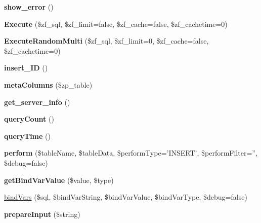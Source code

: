 \begin{DoxyCompactItemize}
\item 
\hypertarget{classquery_factory_ab9ab82f19f9eaf7617f6f3c1ba6398bb}{
{\bfseries show\_\-error} ()}
\label{classquery_factory_ab9ab82f19f9eaf7617f6f3c1ba6398bb}

\item 
\hypertarget{classquery_factory_a5c71f0bd2a0ae26b0c5ac604b0c73b60}{
{\bfseries Execute} (\$zf\_\-sql, \$zf\_\-limit=false, \$zf\_\-cache=false, \$zf\_\-cachetime=0)}
\label{classquery_factory_a5c71f0bd2a0ae26b0c5ac604b0c73b60}

\item 
\hypertarget{classquery_factory_a576bbb7ea2a6ec17eb38b6f680b8d6b2}{
{\bfseries ExecuteRandomMulti} (\$zf\_\-sql, \$zf\_\-limit=0, \$zf\_\-cache=false, \$zf\_\-cachetime=0)}
\label{classquery_factory_a576bbb7ea2a6ec17eb38b6f680b8d6b2}

\item 
\hypertarget{classquery_factory_a25b5b68a20426533de033a8b45f89e18}{
{\bfseries insert\_\-ID} ()}
\label{classquery_factory_a25b5b68a20426533de033a8b45f89e18}

\item 
\hypertarget{classquery_factory_ad83524ae50e28a6dadd7c2da6ff2c708}{
{\bfseries metaColumns} (\$zp\_\-table)}
\label{classquery_factory_ad83524ae50e28a6dadd7c2da6ff2c708}

\item 
\hypertarget{classquery_factory_a4d6dd5a0ccbff3f50559cbf613cf8f54}{
{\bfseries get\_\-server\_\-info} ()}
\label{classquery_factory_a4d6dd5a0ccbff3f50559cbf613cf8f54}

\item 
\hypertarget{classquery_factory_a43f93f2f004b08c528ab29f20eaf2c70}{
{\bfseries queryCount} ()}
\label{classquery_factory_a43f93f2f004b08c528ab29f20eaf2c70}

\item 
\hypertarget{classquery_factory_a2eed54cc34385911b4fbe182aec7f056}{
{\bfseries queryTime} ()}
\label{classquery_factory_a2eed54cc34385911b4fbe182aec7f056}

\item 
\hypertarget{classquery_factory_a93edf2b407aa2ac4286fec137cc7fd66}{
{\bfseries perform} (\$tableName, \$tableData, \$performType='INSERT', \$performFilter='', \$debug=false)}
\label{classquery_factory_a93edf2b407aa2ac4286fec137cc7fd66}

\item 
\hypertarget{classquery_factory_a13966da03310701d6cd2918d0ca82f66}{
{\bfseries getBindVarValue} (\$value, \$type)}
\label{classquery_factory_a13966da03310701d6cd2918d0ca82f66}

\item 
\hyperlink{classquery_factory_adf09b2bc01301f9efe575792bcba7bfe}{bindVars} (\$sql, \$bindVarString, \$bindVarValue, \$bindVarType, \$debug=false)
\item 
\hypertarget{classquery_factory_a3a4d3002cddd51eb5988594a6957aa82}{
{\bfseries prepareInput} (\$string)}
\label{classquery_factory_a3a4d3002cddd51eb5988594a6957aa82}

\end{DoxyCompactItemize}



